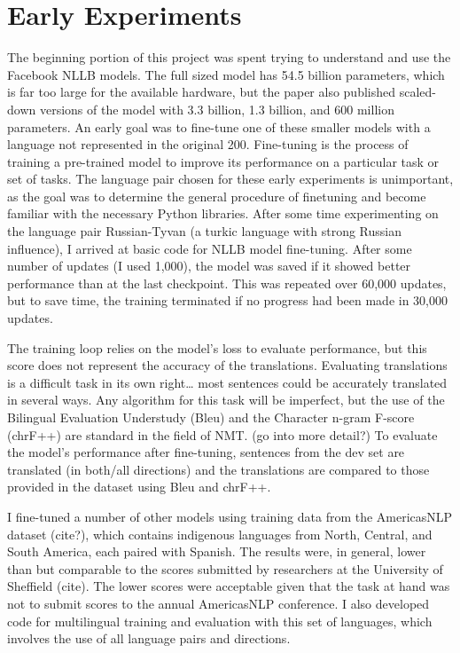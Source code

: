 \section{Early Experiments}

The beginning portion of this project was spent trying to understand and use the Facebook NLLB models. The full sized model has 54.5 billion parameters, which is far too large for the available hardware, but the paper also published scaled-down versions of the model with 3.3 billion, 1.3 billion, and 600 million parameters. An early goal was to fine-tune one of these smaller models with a language not represented in the original 200. Fine-tuning is the process of training a pre-trained model to improve its performance on a particular task or set of tasks. The language pair chosen for these early experiments is unimportant, as the goal was to determine the general procedure of finetuning and become familiar with the necessary Python libraries. After some time experimenting on the language pair Russian-Tyvan (a turkic language with strong Russian influence), I arrived at basic code for NLLB model fine-tuning. After some number of updates (I used 1,000), the model was saved if it showed better performance than at the last checkpoint. This was repeated over 60,000 updates, but to save time, the training terminated if no progress had been made in 30,000 updates.

The training loop relies on the model's loss to evaluate performance, but this score does not represent the accuracy of the translations. Evaluating translations is a difficult task in its own right… most sentences could be accurately translated in several ways. Any algorithm for this task will be imperfect, but the use of the Bilingual Evaluation Understudy (Bleu) and the Character n-gram F-score (chrF++) are standard in the field of NMT. (go into more detail?) To evaluate the model’s performance after fine-tuning, sentences from the dev set are translated (in both/all directions) and the translations are compared to those provided in the dataset using Bleu and chrF++. 

I fine-tuned a number of other models using training data from the AmericasNLP dataset (cite?), which contains indigenous languages from North, Central, and South America, each paired with Spanish. The results were, in general, lower than but comparable to the scores submitted by researchers at the University of Sheffield (cite). The lower scores were acceptable given that the task at hand was not to submit scores to the annual AmericasNLP conference. I also developed code for multilingual training and evaluation with this set of languages, which involves the use of all language pairs and directions. 


